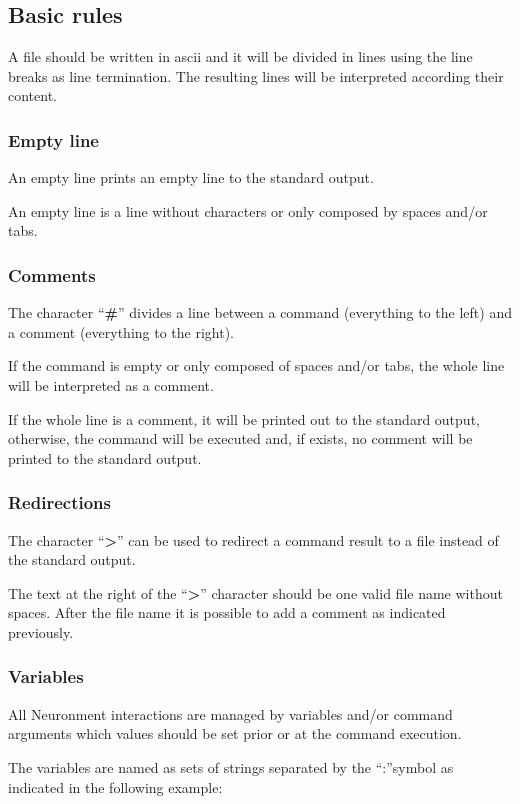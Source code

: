 \subsection{Basic rules}
A \NPROC file should be written in ascii and it will be divided in lines using the line breaks as line termination. The resulting lines will be interpreted according their content.

\subsubsection{Empty line}
An empty line prints an empty line to the standard output.

An empty line is a line without characters or only composed by spaces and/or tabs.

\subsubsection{Comments}
The character ``\textbf{\#}'' divides a line between a command (everything to the left) and a comment (everything to the right).

If the command is empty or only composed of spaces and/or tabs, the whole line will be interpreted as a comment.

If the whole line is a comment, it will be printed out to the standard output, otherwise, the command will be executed and, if exists, no comment will be printed to the standard output.

\subsubsection{Redirections}
The character ``\textbf{>}'' can be used to redirect a command result to a file instead of the standard output.

The text at the right of the ``\textbf{>}'' character should be one valid file name without spaces. After the file name it is possible to add a comment as indicated previously.

\subsubsection{Variables}
All Neuronment interactions are managed by variables and/or command arguments which values should be set prior or at the command execution.

The variables are named as sets of strings separated by the ``:''symbol as indicated in the following example:

